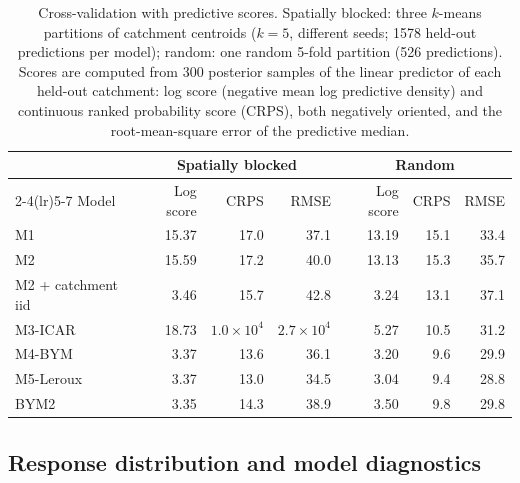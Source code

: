 \documentclass[journal abbreviation, manuscript]{copernicus}
\begin{document}
\begin{table}[h]
\caption{Cross-validation with predictive scores. Spatially blocked: three $k$-means partitions of catchment centroids ($k = 5$, different seeds; 1578 held-out predictions per model); random: one random 5-fold partition (526 predictions). Scores are computed from 300 posterior samples of the linear predictor of each held-out catchment: log score (negative mean log predictive density) and continuous ranked probability score (CRPS), both negatively oriented, and the root-mean-square error of the predictive median.}\label{tabA4b}
\footnotesize
\begin{tabular}{@{}lrrrrrr@{}}
\toprule
 & \multicolumn{3}{c}{Spatially blocked} & \multicolumn{3}{c}{Random} \\
\cmidrule(lr){2-4}\cmidrule(lr){5-7}
Model & Log score & CRPS & RMSE & Log score & CRPS & RMSE \\
\midrule
M1 & 15.37 & 17.0 & 37.1 & 13.19 & 15.1 & 33.4 \\
M2 & 15.59 & 17.2 & 40.0 & 13.13 & 15.3 & 35.7 \\
M2 + catchment iid & 3.46 & 15.7 & 42.8 & 3.24 & 13.1 & 37.1 \\
M3-ICAR & 18.73 & $1.0 \times 10^{4}$ & $2.7 \times 10^{4}$ & 5.27 & 10.5 & 31.2 \\
M4-BYM & 3.37 & 13.6 & 36.1 & 3.20 & 9.6 & 29.9 \\
M5-Leroux & 3.37 & 13.0 & 34.5 & 3.04 & 9.4 & 28.8 \\
BYM2 & 3.35 & 14.3 & 38.9 & 3.50 & 9.8 & 29.8 \\
\bottomrule
\end{tabular}
\end{table}

\subsection{Response distribution and model diagnostics}\label{secA5}
\end{document}

